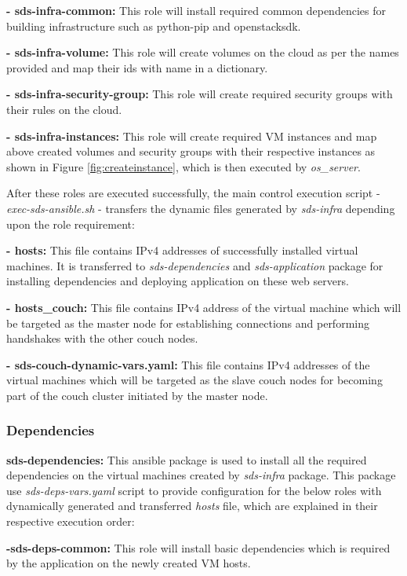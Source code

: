 \textbf{- sds-infra-common:} This role will install required common dependencies for building infrastructure such as python-pip and openstacksdk.

\textbf{- sds-infra-volume:} This role will create volumes on the cloud as per the names provided and map their ids with name in a dictionary.

\textbf{ - sds-infra-security-group:} This role will create required security groups with their rules on the cloud.

\textbf{ - sds-infra-instances:} This role will create required VM instances and map above created volumes and security groups with their respective instances as shown in Figure \ref{fig:createinstance}, which is then executed by \emph{os\_server}.

After these roles are executed successfully, the main control execution script - \emph{exec-sds-ansible.sh} - transfers the dynamic files generated by \emph{sds-infra} depending upon the role requirement:

\textbf{- hosts:} This file contains IPv4 addresses of successfully installed virtual machines. It is transferred to \emph{sds-dependencies} and \emph{sds-application} package for installing dependencies and deploying application on these web servers.

\textbf{ - hosts\_couch:} This file contains IPv4 address of the virtual machine which will be targeted as the master node for establishing connections and performing handshakes with the other couch nodes. 

\textbf{ - sds-couch-dynamic-vars.yaml:} This file contains IPv4 addresses of the virtual machines which will be targeted as the slave couch nodes for becoming part of the couch cluster initiated by the master node.


\subsubsection{Dependencies}
\textbf{sds-dependencies:} This ansible package is used to install all the required dependencies on the virtual machines created by \emph{sds-infra} package. 
This package use \emph{sds-deps-vars.yaml} script to provide configuration for the below roles with dynamically generated and transferred \emph{hosts} file, which are explained in their respective execution order:

\textbf{-sds-deps-common:} This role will install basic dependencies which is required by the application on the newly created VM hosts.

